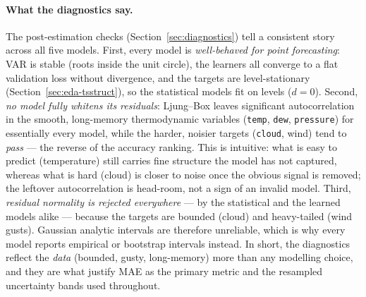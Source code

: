 \documentclass[12pt,a4paper,oneside]{report}
\begin{document}
\paragraph{What the diagnostics say.} The post-estimation checks
(Section~\ref{sec:diagnostics}) tell a consistent story across all five models.
First, every model is \emph{well-behaved for point forecasting}: VAR is stable
(roots inside the unit circle), the learners all converge to a flat validation
loss without divergence, and the targets are level-stationary
(Section~\ref{sec:eda-tsstruct}), so the statistical models fit on levels
($d{=}0$). Second, \emph{no model fully whitens its residuals}: Ljung--Box leaves
significant autocorrelation in the smooth, long-memory thermodynamic variables
(\texttt{temp}, \texttt{dew}, \texttt{pressure}) for essentially every model,
while the harder, noisier targets (\texttt{cloud}, wind) tend to \emph{pass} ---
the reverse of the accuracy ranking. This is intuitive: what is easy to predict
(temperature) still carries fine structure the model has not captured, whereas
what is hard (cloud) is closer to noise once the obvious signal is removed; the
leftover autocorrelation is head-room, not a sign of an invalid model. Third,
\emph{residual normality is rejected everywhere} --- by the statistical and the
learned models alike --- because the targets are bounded (cloud) and heavy-tailed
(wind gusts). Gaussian analytic intervals are therefore unreliable, which is why
every model reports empirical or bootstrap intervals instead. In short, the
diagnostics reflect the \emph{data} (bounded, gusty, long-memory) more than any
modelling choice, and they are what justify MAE as the primary metric and the
resampled uncertainty bands used throughout.



\end{document}
